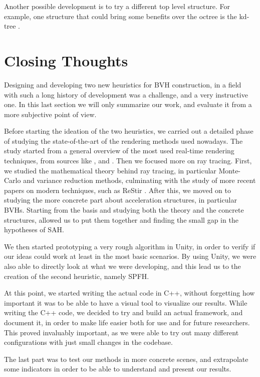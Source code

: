 \documentclass{PoliMi_MasterThesis}
\begin{document}
Another possible development is to try a different top level structure. For example, one structure that could bring some benefits over the octree is the kd-tree \cite{TODO}.

\section{Closing Thoughts} \label{sec:closing_thoughts}
Designing and developing two new heuristics for BVH construction, in a field with such a long history of development was a challenge, and a very instructive one. In this last section we will only summarize our work, and evaluate it from a more subjective point of view.

Before starting the ideation of the two heuristics, we carried out a detailed phase of studying the state-of-the-art of the rendering methods used nowadays. The study started from a general overview of the most used real-time rendering techniques, from sources like \cite{TODO}, \cite{TODO} and \cite{TODO}. Then we focused more on ray tracing. First, we studied the mathematical theory behind ray tracing, in particular Monte-Carlo and variance reduction methods, culminating with the study of more recent papers on modern techniques, such as ReStir \cite{TODO}. After this, we moved on to studying the more concrete part about acceleration structures, in particular BVHs. Starting from the basis and studying both the theory and the concrete structures, allowed us to put them together and finding the small gap in the hypotheses of SAH.

We then started prototyping a very rough algorithm in Unity, in order to verify if our ideas could work at least in the most basic scenarios. By using Unity, we were also able to directly look at what we were developing, and this lead us to the creation of the second heuristic, namely SPFH. 

At this point, we started writing the actual code in C++, without forgetting how important it was to be able to have a visual tool to visualize our results. While writing the C++ code, we decided to try and build an actual framework, and document it, in order to make life easier both for use and for future researchers. This proved invaluably important, as we were able to try out many different configurations with just small changes in the codebase.

The last part was to test our methods in more concrete scenes, and extrapolate some indicators in order to be able to understand and present our results.
\end{document}
